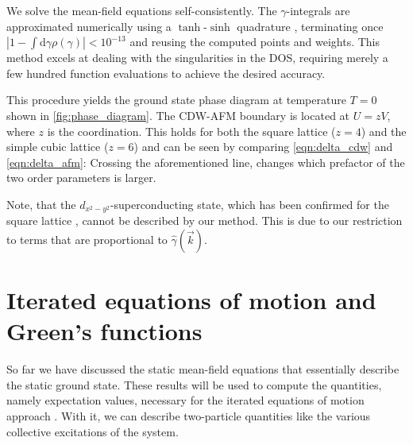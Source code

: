 \documentclass[
    reprint, 
    aps,
    preprintnumbers,
    twocolumn,
    prb,
    superscriptaddress
]{revtex4-2}
\newcommand{\vk}{\vec{k}}
\newcommand{\dgamma}{\mathrm{d}\gamma}
\begin{document}
We solve the mean-field equations self-consistently.
The $\gamma$-integrals are approximated numerically using a $\tanh$-$\sinh$ quadrature \cite{takahasi73}, 
terminating once $|1 - \int \dgamma \rho(\gamma)| < 10^{-13}$ and reusing the computed points and weights.
This method excels at dealing with the singularities in the DOS, 
requiring merely a few hundred function evaluations to achieve the desired accuracy.

This procedure yields the ground state phase diagram at temperature $T=0$ shown in \autoref{fig:phase_diagram}.
The CDW-AFM boundary is located at $U = zV$, where $z$ is the coordination.
This holds for both the square lattice ($z=4$) and the simple cubic lattice ($z=6$) and can be seen by comparing \eqref{eqn:delta_cdw} and \eqref{eqn:delta_afm}:
Crossing the aforementioned line, changes which prefactor of the two order parameters is larger.

Note, that the $d_{x^2 - y^2}$-superconducting state, which has been confirmed for the square lattice \cite{Micnas88b,Huang13}, cannot be described by our method. 
This is due to our restriction to terms that are proportional to $\hat{\gamma}(\vk)$.


\section{Iterated equations of motion and Green's functions}\label{sec:ieom}

So far we have discussed the static mean-field equations that essentially describe the static ground state.
These results will be used to compute the quantities, namely expectation values, necessary for the iterated equations of motion approach \cite{uhrig09,hamerla13,hamerla14,bleicker18}.
With it, we can describe two-particle quantities like the various collective excitations of the system.
\end{document}

